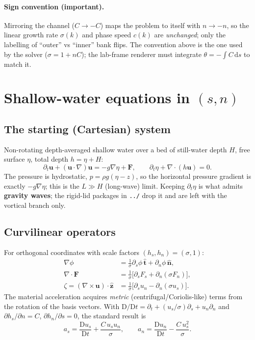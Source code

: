 \documentclass[11pt]{article}
\newcommand{\us}{u_s}
\newcommand{\un}{u_n}
\newcommand{\ds}{\partial_s}
\newcommand{\dn}{\partial_n}
\newcommand{\dt}{\partial_t}
\newcommand{\code}[1]{\texttt{\small #1}}
\begin{document}
\paragraph{Sign convention (important).} Mirroring the channel ($C\to-C$) maps the
problem to itself with $n\to-n$, so the linear growth rate $\sigma(k)$ and phase
speed $c(k)$ are \emph{unchanged}; only the labelling of ``outer'' vs ``inner''
bank flips. The convention above is the one used by the solver
($\sigma=1+nC$); the lab-frame renderer must integrate $\theta=-\int C\,\mathrm ds$
to match it.

\section{Shallow-water equations in $(s,n)$}

\subsection{The starting (Cartesian) system}
Non-rotating depth-averaged shallow water over a bed of still-water depth $H$,
free surface $\eta$, total depth $h=\eta+H$:
\begin{equation}
  \dt\bm u+(\bm u\cdot\nabla)\bm u=-g\nabla\eta+\bm F,
  \qquad
  \dt\eta+\nabla\cdot(h\bm u)=0 .
  \label{eq:sw-cart}
\end{equation}
The pressure is hydrostatic, $p=\rho g(\eta-z)$, so the horizontal pressure
gradient is exactly $-g\nabla\eta$; this is the $L\gg H$ (long-wave) limit.
Keeping $\dt\eta$ is what admits \textbf{gravity waves}; the rigid-lid packages in
\code{../} drop it and are left with the vortical branch only.

\subsection{Curvilinear operators}
For orthogonal coordinates with scale factors $(h_s,h_n)=(\sigma,1)$:
\begin{align}
  \nabla\phi&=\frac{1}{\sigma}\ds\phi\,\hat{\bm t}+\dn\phi\,\hat{\bm n},\\
  \nabla\cdot\bm F&=\frac{1}{\sigma}\Big[\ds F_s+\dn(\sigma F_n)\Big],
  \label{eq:div}\\
  \zeta=(\nabla\times\bm u)\cdot\hat{\bm z}&=\frac{1}{\sigma}\Big[\ds \un-\dn(\sigma \us)\Big].
  \label{eq:vort}
\end{align}
The material acceleration acquires \emph{metric} (centrifugal/Coriolis-like) terms
from the rotation of the basis vectors. With
$\mathrm D/\mathrm Dt=\dt+(\us/\sigma)\ds+\un\dn$ and
$\partial h_s/\partial n=C$, $\partial h_n/\partial s=0$, the standard result is
\begin{equation}
  a_s=\frac{\mathrm D\us}{\mathrm Dt}+\frac{C\,\us\un}{\sigma},
  \qquad
  a_n=\frac{\mathrm D\un}{\mathrm Dt}-\frac{C\,\us^{2}}{\sigma}.
  \label{eq:accel}
\end{equation}
\end{document}
